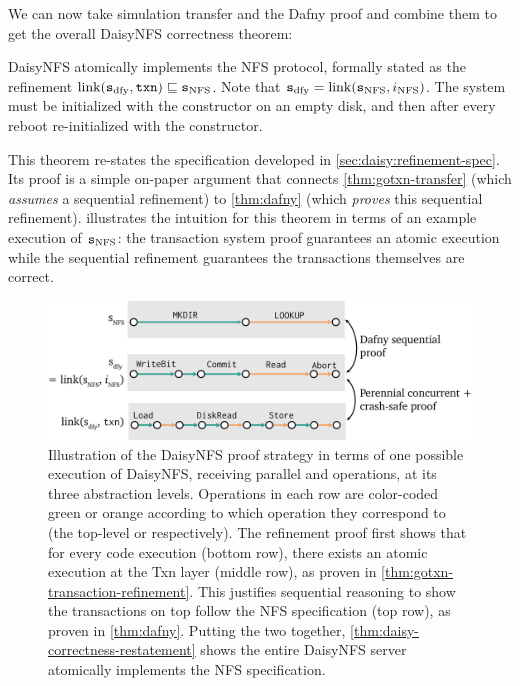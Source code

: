\setcounter{theorem}{0}

We can now take simulation transfer and the Dafny proof and combine them to get
the overall DaisyNFS correctness theorem:
\begin{theorem}
  DaisyNFS atomically implements the NFS protocol, formally stated as the
  refinement $\mathrm{link}(\texttt{s}_{\mathrm{dfy}}, \texttt{txn}) \sqsubseteq \texttt{s}_{\mathrm{NFS}}$. Note that
  $\texttt{s}_{\mathrm{dfy}} = \mathrm{link}(\texttt{s}_{\mathrm{NFS}}, i_{\mathrm{NFS}})$. The system must be initialized with the
   constructor on an empty disk, and then after every reboot
  re-initialized with the  constructor.
  \label{thm:daisy-correctness-restatement}
\end{theorem}

This theorem re-states the specification developed in
\cref{sec:daisy:refinement-spec}. Its proof is a simple on-paper argument that
connects \cref{thm:gotxn-transfer} (which \emph{assumes} a sequential
refinement) to \cref{thm:dafny} (which \emph{proves} this sequential refinement).
 illustrates
the intuition for this theorem in terms of an example execution of $\texttt{s}_{\mathrm{NFS}}$: the transaction system proof guarantees an
atomic execution while the sequential refinement guarantees the transactions
themselves are correct.

\begin{figure}
  \centering
  \includegraphics{fig/refinement-execs.png}
  \caption[Overall DaisyNFS proof strategy]{Illustration of the DaisyNFS proof
    strategy in terms of one
    possible execution of DaisyNFS, receiving parallel  and 
    operations, at its three abstraction levels. Operations in each row are
    color-coded green or orange according to which operation they correspond to
    (the top-level  or  respectively). The refinement proof first
    shows that for every code execution (bottom row), there exists an atomic
    execution at the Txn layer (middle row), as proven in
    \cref{thm:gotxn-transaction-refinement}. This justifies sequential reasoning to
    show the transactions on top follow the NFS specification (top row), as
    proven in \cref{thm:dafny}. Putting the two together,
    \cref{thm:daisy-correctness-restatement} shows the entire DaisyNFS server atomically
    implements the NFS specification.}
  \label{fig:refinement-execs}
\end{figure}

